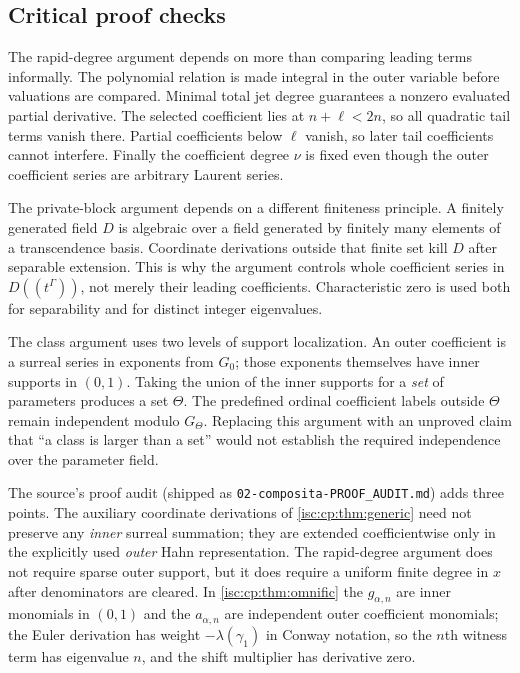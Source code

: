 \documentclass[11pt,letterpaper]{article}
\theoremstyle{definition}
\theoremstyle{remark}
\newcommand{\rpath}[1]{\nolinkurl{#1}}%
\numberwithin{equation}{section}
\begin{document}
\subsection{Critical proof checks}

The rapid-degree argument depends on more than comparing leading terms
informally. The polynomial relation is made integral in the outer variable
before valuations are compared. Minimal total jet degree guarantees a
nonzero evaluated partial derivative. The selected coefficient lies at
$n+\ell<2n$, so all quadratic tail terms vanish there. Partial coefficients
below $\ell$ vanish, so later tail coefficients cannot interfere. Finally the
coefficient degree $\nu$ is fixed even though the outer coefficient series
are arbitrary Laurent series.

The private-block argument depends on a different finiteness principle. A
finitely generated field $D$ is algebraic over a field generated by finitely
many elements of a transcendence basis. Coordinate derivations outside that
finite set kill $D$ after separable extension. This is why the argument
controls whole coefficient series in $D((t^\Gamma))$, not merely their
leading coefficients. Characteristic zero is used both for separability and
for distinct integer eigenvalues.

The class argument uses two levels of support localization. An outer
coefficient is a surreal series in exponents from $G_0$; those exponents
themselves have inner supports in $(0,1)$. Taking the union of the inner
supports for a \emph{set} of parameters produces a set $\Theta$. The
predefined ordinal coefficient labels outside $\Theta$ remain independent
modulo $G_\Theta$. Replacing this argument with an unproved claim that ``a
class is larger than a set'' would not establish the required independence
over the parameter field.

The source's proof audit (shipped as \rpath{02-composita-PROOF\_AUDIT.md})
adds three points. The auxiliary coordinate derivations of
\cref{isc:cp:thm:generic} need not preserve any \emph{inner} surreal
summation; they are extended coefficientwise only in the explicitly used
\emph{outer} Hahn representation. The rapid-degree argument does not require
sparse outer support, but it does require a uniform finite degree in $x$
after denominators are cleared. In \cref{isc:cp:thm:omnific} the
$g_{\alpha,n}$ are inner monomials in $(0,1)$ and the $a_{\alpha,n}$ are
independent outer coefficient monomials; the Euler derivation has weight
$-\lambda(\gamma_1)$ in Conway notation, so the $n$th witness term has
eigenvalue $n$, and the shift multiplier has derivative zero.
\end{document}
